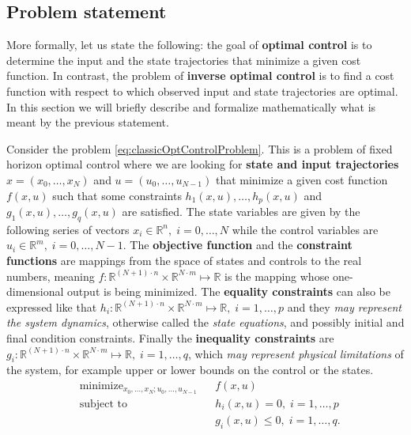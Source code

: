 \documentclass[12pt, a4paper]{article}
\DeclareMathOperator*{\minimize}{minimize}
\begin{document}
\subsection{Problem statement}
More formally, let us state the following: the goal of \textbf{optimal control} is to determine the input and the state trajectories that minimize a given cost function. In contrast, the problem of \textbf{inverse optimal control} is to find a cost function with respect to which observed input and state trajectories are optimal.  In this section we will briefly describe and formalize mathematically what is meant by the previous statement.\par
Consider the problem \eqref{eq:classicOptControlProblem}. This is a problem of fixed horizon optimal control where we are looking for \textbf{state and input trajectories} \( x = (x_0, \ldots, x_N)\) and \( u = (u_0,\ldots,u_{N-1})\) that minimize a given cost function \( f(x, u) \) such that some constraints \( h_1(x, u), \ldots, h_p(x, u) \) and  \( g_1(x, u), \ldots, g_q(x, u) \) are satisfied. The state variables are given by the following series of vectors \( x_i \in \mathbb{R}^n, \; i=0, \ldots, N \) while the control variables are  \( u_i \in \mathbb{R}^m, \; i=0, \ldots, N-1 \). The \textbf{objective function} and the \textbf{constraint functions} are mappings from the space of states and controls to the real numbers, meaning \( f: \mathbb{R}^{(N+1)\cdot n} \times \mathbb{R}^{N \cdot m} \mapsto \mathbb{R} \) is the mapping whose one-dimensional output is being minimized. The \textbf{equality constraints} can also be expressed like that \( h_i: \mathbb{R}^{(N+1)\cdot n} \times \mathbb{R}^{N \cdot m} \mapsto \mathbb{R}, \; i = 1,\ldots, p\) and they \textit{may represent the system dynamics}, otherwise called the \textit{state equations}, and possibly initial and final condition constraints. Finally the \textbf{inequality constraints} are \( g_i: \mathbb{R}^{(N+1)\cdot n} \times \mathbb{R}^{N \cdot m} \mapsto \mathbb{R}, \; i = 1,\ldots, q \), which \textit{may represent physical limitations} of the system, for example upper or lower bounds on the control or the states.
\begin{equation} \label{eq:classicOptControlProblem}
\begin{aligned}
    & \minimize_{x_0, \ldots, x_N ; u_0,\ldots,u_{N-1}}   &   &f(x, u) \\
    & \text{subject to} &   &h_i(x, u) = 0, \; i = 1,\ldots,p \\
    &                   &   &g_i(x, u) \leq 0, \; i = 1,\ldots,q.
\end{aligned}
\end{equation}
\end{document}
